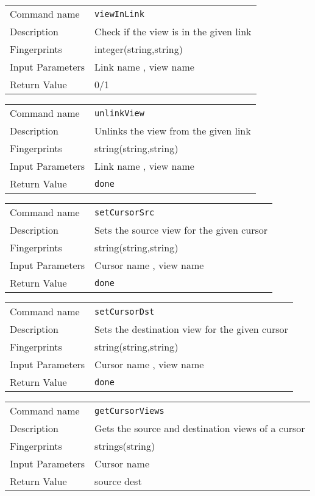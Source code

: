 \noindent
\begin{tabular}{l|p{5in}}
\hline
Command name &{\tt viewInLink }\\ 
Description &
 Check if the view is in the given link 
 	\\
Fingerprints & integer(string,string)\\
Input Parameters& Link name , view name \\
Return Value& 0/1 \\
\hline
\end{tabular}
\bigskip

\noindent
\begin{tabular}{l|p{5in}}
\hline
Command name &{\tt unlinkView }\\ 
Description &
 Unlinks the view from the given link 
 	\\
Fingerprints & string(string,string)\\
Input Parameters& Link name , view name \\
Return Value&{\tt done}\\
\hline
\end{tabular}
\bigskip

\noindent
\begin{tabular}{l|p{5in}}
\hline
Command name &{\tt setCursorSrc }\\ 
Description &
 Sets the source view for the given cursor 
 	\\
Fingerprints & string(string,string)\\
Input Parameters& Cursor name , view name \\
Return Value&{\tt done}\\
\hline
\end{tabular}
\bigskip

\noindent
\begin{tabular}{l|p{5in}}
\hline
Command name &{\tt setCursorDst }\\ 
Description &
 Sets the destination view for the given cursor 
 	\\
Fingerprints & string(string,string)\\
Input Parameters& Cursor name , view name \\
Return Value&{\tt done}\\
\hline
\end{tabular}
\bigskip

\noindent
\begin{tabular}{l|p{5in}}
\hline
Command name &{\tt getCursorViews }\\ 
Description &
 Gets the source and destination views of a cursor 
 	\\
Fingerprints & strings(string)\\
Input Parameters& Cursor name \\
Return Value& source dest\\
\hline
\end{tabular}
\bigskip


